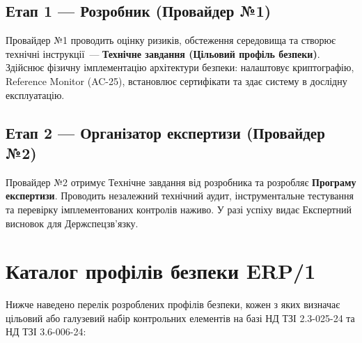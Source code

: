 \subsection{Етап 1 --- Розробник (Провайдер №1)}

Провайдер №1 проводить оцінку ризиків, обстеження середовища та створює технічні інструкції~---
\textbf{Технічне завдання (Цільовий профіль безпеки)}. Здійснює фізичну імплементацію архітектури
безпеки: налаштовує криптографію, Reference Monitor (AC-25), встановлює сертифікати та здає
систему в дослідну експлуатацію.

\subsection{Етап 2 --- Організатор експертизи (Провайдер №2)}

Провайдер №2 отримує Технічне завдання від розробника та розробляє \textbf{Програму експертизи}.
Проводить незалежний технічний аудит, інструментальне тестування та перевірку імплементованих
контролів наживо. У разі успіху видає Експертний висновок для Держспецзв'язку.

\section{Каталог профілів безпеки ERP/1}

Нижче наведено перелік розроблених профілів безпеки, кожен з яких визначає цільовий або
галузевий набір контрольних елементів на базі НД ТЗІ 2.3-025-24 та НД ТЗІ 3.6-006-24:

